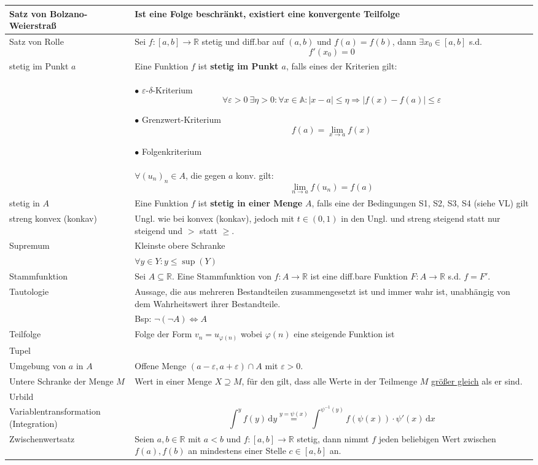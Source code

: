 \documentclass{article}
\newcommand{\diff}{\mathrm{d}}
\begin{document}
\begin{xltabular}{\linewidth}{p{6cm}|X}
	\hline
		Satz von Bolzano-Weierstraß & Ist eine Folge beschränkt, existiert eine konvergente Teilfolge \\
	\hline
		Satz von Rolle & Sei $f:[a,b]\rightarrow\mathbb{R}$ stetig und diff.bar auf $(a,b)$ und $f(a) = f(b)$, dann $\exists x_0 \in [a,b]$ s.d.
		$$f'(x_0) = 0$$ \\
	\hline
		stetig im Punkt $a$ & Eine Funktion $f$ ist \textbf{stetig im Punkt $a$}, falls eines der Kriterien gilt:\\
		& $\bullet$ $\varepsilon$-$\delta$-Kriterium 
			$$\forall\varepsilon > 0\ \exists\eta > 0: \forall x\in\mathbb{A}: |x-a| \leq \eta \Rightarrow |f(x) - f(a)| \leq \varepsilon$$
			
		$\bullet$  Grenzwert-Kriterium
			$$f(a) = \lim_{x\rightarrow a} f(x)$$
			
		$\bullet$ Folgenkriterium \\
		&\phantom{$\bullet$} $\forall (u_n)_n \in A$, die gegen $a$ konv. gilt: 
			$$\lim_{n\rightarrow a} f(u_n) = f(a)$$ \\
	\hline
		stetig in $A$ & Eine Funktion $f$ ist \textbf{stetig in einer Menge} $A$, falls eine der Bedingungen S1, S2, S3, S4 (siehe VL) gilt \\
	\hline
		streng konvex (konkav) & Ungl. wie bei konvex (konkav), jedoch mit $t\in(0,1)$ in den Ungl. und streng steigend statt nur steigend und $>$ statt $\geq$.\\
	\hline
	 	Supremum & Kleinste obere Schranke \\
	 	& $\forall y\in Y: y\leq \sup(Y)$ \\
	\hline
		Stammfunktion & Sei $A\subseteq \mathbb{R}$. Eine Stammfunktion von $f:A\rightarrow\mathbb{R}$ ist eine diff.bare Funktion $F:A\rightarrow\mathbb{R}$ s.d. $f=F'$. \\
	\hline
		Tautologie & Aussage, die aus mehreren Bestandteilen zusammengesetzt ist und immer wahr ist, unabhängig von dem Wahrheitswert ihrer Bestandteile. \\
		& Bsp: $\neg(\neg A) \Leftrightarrow A$ \\
	\hline
		Teilfolge & Folge der Form $v_n = u_{\varphi(n)}$ wobei $\varphi(n)$ eine steigende Funktion ist \\
	\hline
		Tupel &  \\
	\hline
		Umgebung von $a$ in $A$ & Offene Menge $(a - \varepsilon, a + \varepsilon) \cap A$ mit $\varepsilon > 0$. \\
	\hline
		Untere Schranke der Menge $M$ & Wert in einer Menge $X \supseteq M$, für den gilt, dass alle Werte in der Teilmenge $M$ \underline{größer gleich} als er sind.\\
	\hline
		Urbild & \\
	\hline
		Variablentransformation (Integration) & $$\int^y f(y)\,\diff y \stackrel{y = \psi(x)}{=} \int^{\psi^{-1}(y)} f(\psi(x)) \cdot \psi'(x)\,\diff x$$ \\
	\hline
		Zwischenwertsatz & Seien $a,b\in\mathbb{R}$ mit $a<b$ und $f:[a,b]\rightarrow\mathbb{R}$ stetig, dann nimmt $f$ jeden beliebigen Wert zwischen $f(a),f(b)$ an mindestens einer Stelle $c\in[a,b]$ an. \\
	\hline\hline
\end{xltabular}
\end{document}
